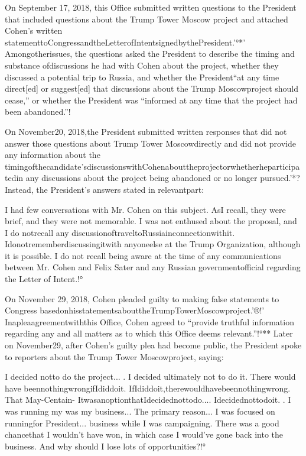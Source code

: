 On September 17, 2018, this Office submitted written questions to the President that included questions about the Trump Tower Moscow project and attached Cohen’s written statementtoCongressandtheLetterofIntentsignedbythePresident.'°*’ Amongotherissues, the questions asked the President to describe the timing and substance ofdiscussions he had with Cohen about the project, whether they discussed a potential trip to Russia, and whether the President“at any time direct[ed] or suggest[ed] that discussions about the Trump Moscowproject should cease,” or whether the President was “informed at any time that the project had been abandoned.”!%

On November20, 2018,the President submitted written responses that did not answer those questions about Trump Tower Moscowdirectly and did not provide any information about the timingofthecandidate’sdiscussionswithCohenabouttheprojectorwhetherheparticipatedin any discussions about the project being abandoned or no longer pursued.'*? Instead, the President’s answers stated in relevantpart:

I had few conversations with Mr. Cohen on this subject. AsI recall, they were brief, and they were not memorable. I was not enthused about the proposal, and I do notrecall any discussionoftraveltoRussiainconnectionwithit. Idonotrememberdiscussingitwith anyoneelse at the Trump Organization, although it is possible. I do not recall being aware at the time of any communications between Mr. Cohen and Felix Sater and any Russian governmentofficial regarding the Letter of Intent.!°

On November 29, 2018, Cohen pleaded guilty to making false statements to Congress basedonhisstatementsabouttheTrumpTowerMoscowproject.'®!' Inapleaagreementwiththis Office, Cohen agreed to “provide truthful information regarding any and all matters as to which this Office deems relevant.”!°** Later on November29, after Cohen’s guilty plea had become public, the President spoke to reporters about the Trump Tower Moscowproject, saying:

I decided notto do the project... . I decided ultimately not to do it. There would have beennothingwrongifIdiddoit. IfIdiddoit,therewouldhavebeennothingwrong. That
May-Centain-
ItwasanoptionthatIdecidednottodo.... Idecidednottodoit. . I was running my
was my business...
The primary reason... I was focused on runningfor President...
business while I was campaigning. There was a good chancethat I wouldn’t have won, in which case I would’ve gone back into the business. And why should I lose lots of opportunities?!°


